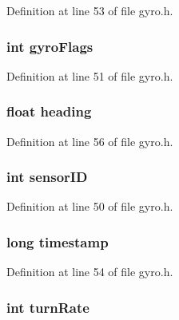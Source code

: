 Definition at line 53 of file gyro.h.

\hypertarget{struct_g_y_r_o_a1f856a6c5a2496da48674527809c15d3}{
\subsubsection[{gyroFlags}]{\setlength{\rightskip}{0pt plus 5cm}int {\bf gyroFlags}}}
\label{struct_g_y_r_o_a1f856a6c5a2496da48674527809c15d3}


Definition at line 51 of file gyro.h.

\hypertarget{struct_g_y_r_o_ac5682e48513a771560df50e3b213e61a}{
\subsubsection[{heading}]{\setlength{\rightskip}{0pt plus 5cm}float {\bf heading}}}
\label{struct_g_y_r_o_ac5682e48513a771560df50e3b213e61a}


Definition at line 56 of file gyro.h.

\hypertarget{struct_g_y_r_o_a4f5a5e2cb7ee061dd0bd29b7086d89ac}{
\subsubsection[{sensorID}]{\setlength{\rightskip}{0pt plus 5cm}int {\bf sensorID}}}
\label{struct_g_y_r_o_a4f5a5e2cb7ee061dd0bd29b7086d89ac}


Definition at line 50 of file gyro.h.

\hypertarget{struct_g_y_r_o_ac5deed89768140dbc80dbc6529a5e14a}{
\subsubsection[{timestamp}]{\setlength{\rightskip}{0pt plus 5cm}long {\bf timestamp}}}
\label{struct_g_y_r_o_ac5deed89768140dbc80dbc6529a5e14a}


Definition at line 54 of file gyro.h.

\hypertarget{struct_g_y_r_o_a752eff326455596e842b018329b98ab3}{
\subsubsection[{turnRate}]{\setlength{\rightskip}{0pt plus 5cm}int {\bf turnRate}}}
\label{struct_g_y_r_o_a752eff326455596e842b018329b98ab3}


